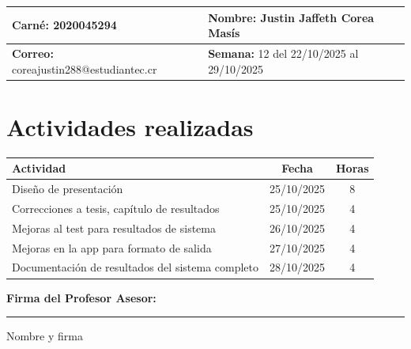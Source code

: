 \documentclass[12pt,a4paper]{article}
\begin{document}
\noindent
\begin{tabularx}{\textwidth}{|X|X|}
\hline
\textbf{Carné:} 2020045294 & \textbf{Nombre:} Justin Jaffeth Corea Masís \\
\hline
\textbf{Correo:} coreajustin288@estudiantec.cr & \textbf{Semana:} 12 del 22/10/2025 al 29/10/2025 \\
\hline
\end{tabularx}

\vspace{0.5cm}

\section*{Actividades realizadas}

\begin{tabularx}{\textwidth}{|>{\raggedright\arraybackslash}p{12cm}|c|c|}
\hline
\textbf{Actividad} & \textbf{Fecha} & \textbf{Horas} \\
\hline
	Diseño de presentación & 25/10/2025 & 8 \\
\hline
	Correcciones a tesis, capítulo de resultados & 25/10/2025 & 4 \\
\hline
	Mejoras al test para resultados de sistema & 26/10/2025 & 4 \\
\hline
	Mejoras en la app para formato de salida & 27/10/2025 & 4 \\
\hline
	Documentación de resultados del sistema completo & 28/10/2025 & 4 \\
\hline
\end{tabularx}

\vspace{1cm}

\noindent
\textbf{Firma del Profesor Asesor:}

\vspace{2cm}

\noindent\rule{8cm}{0.4pt}  
Nombre y firma
\end{document}
